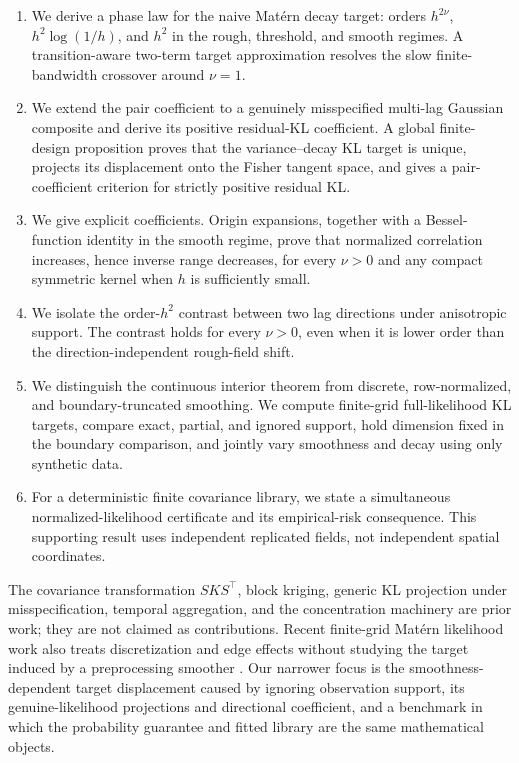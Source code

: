 \documentclass[11pt]{article}
\theoremstyle{remark}
\begin{document}
\begin{enumerate}
  \item We derive a phase law for the naive Mat\'ern decay target: orders
  \(h^{2\nu}\), \(h^2\log(1/h)\), and \(h^2\) in the rough, threshold, and
  smooth regimes.  A transition-aware two-term target approximation resolves
  the slow finite-bandwidth crossover around \(\nu=1\).
  \item We extend the pair coefficient to a genuinely misspecified multi-lag
  Gaussian composite and derive its positive residual-KL coefficient. A
  global finite-design proposition proves that the variance--decay KL target
  is unique, projects its displacement onto the Fisher tangent space, and gives
  a pair-coefficient criterion for strictly positive residual KL.
  \item We give explicit coefficients.  Origin expansions, together with a
  Bessel-function identity in the smooth regime, prove that normalized
  correlation increases, hence inverse range decreases, for every \(\nu>0\)
  and any compact symmetric kernel when \(h\) is sufficiently small.
  \item We isolate the order-\(h^2\) contrast between two lag directions under
  anisotropic support.  The contrast holds for every \(\nu>0\), even when it is
  lower order than the direction-independent rough-field shift.
  \item We distinguish the continuous interior theorem from discrete,
  row-normalized, and boundary-truncated smoothing. We compute finite-grid
  full-likelihood KL targets, compare exact, partial, and ignored support, hold
  dimension fixed in the boundary comparison, and jointly vary smoothness and
  decay using only synthetic data.
  \item For a deterministic finite covariance library, we state a simultaneous
  normalized-likelihood certificate and its empirical-risk consequence.  This
  supporting result uses independent replicated fields, not independent spatial
  coordinates.
\end{enumerate}

The covariance transformation \(S K S^\top\), block kriging, generic KL
projection under misspecification, temporal aggregation, and the concentration
machinery are prior work; they are not claimed as contributions.  Recent
finite-grid Mat\'ern likelihood work also treats discretization and edge effects
without studying the target induced by a preprocessing smoother
\citep{simons2026finite}.  Our narrower focus is the smoothness-dependent target
displacement caused by ignoring observation support, its genuine-likelihood
projections and directional coefficient, and a benchmark in which the probability guarantee and fitted
library are the same mathematical objects.
\end{document}
